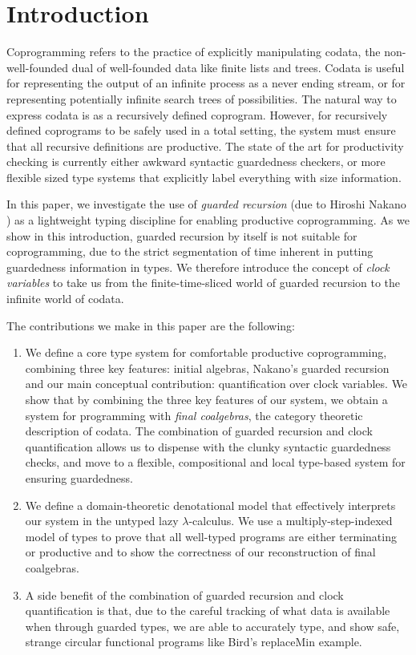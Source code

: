 \section{Introduction}
\label{sec:introduction}

Coprogramming refers to the practice of explicitly manipulating
codata, the non-well-founded dual of well-founded data like finite
lists and trees. Codata is useful for representing the output of an
infinite process as a never ending stream, or for representing
potentially infinite search trees of possibilities. The natural way to
express codata is as a recursively defined coprogram. However, for
recursively defined coprograms to be safely used in a total setting,
the system must ensure that all recursive definitions are
productive. The state of the art for productivity checking is
currently either awkward syntactic guardedness checkers, or more
flexible sized type systems that explicitly label everything with size
information.

In this paper, we investigate the use of \emph{guarded recursion} (due
to Hiroshi Nakano \cite{nakano00modality}) as a lightweight typing
discipline for enabling productive coprogramming. As we show in this
introduction, guarded recursion by itself is not suitable for
coprogramming, due to the strict segmentation of time inherent in
putting guardedness information in types. We therefore introduce the
concept of \emph{clock variables} to take us from the
finite-time-sliced world of guarded recursion to the infinite world of
codata.

The contributions we make in this paper are the following:
\begin{enumerate}
\item We define a core type system for comfortable productive
  coprogramming, combining three key features: initial algebras,
  Nakano's guarded recursion and our main conceptual contribution:
  quantification over clock variables. We show that by combining the
  three key features of our system, we obtain a system for programming
  with \emph{final coalgebras}, the category theoretic description of
  codata. The combination of guarded recursion and clock
  quantification allows us to dispense with the clunky syntactic
  guardedness checks, and move to a flexible, compositional and local
  type-based system for ensuring guardedness.
\item We define a domain-theoretic denotational model that effectively
  interprets our system in the untyped lazy $\lambda$-calculus. We use
  a multiply-step-indexed model of types to prove that all well-typed
  programs are either terminating or productive and to show the
  correctness of our reconstruction of final coalgebras.
\item A side benefit of the combination of guarded recursion and clock
  quantification is that, due to the careful tracking of what data is
  available when through guarded types, we are able to accurately
  type, and show safe, strange circular functional programs like
  Bird's replaceMin example.
\end{enumerate}

